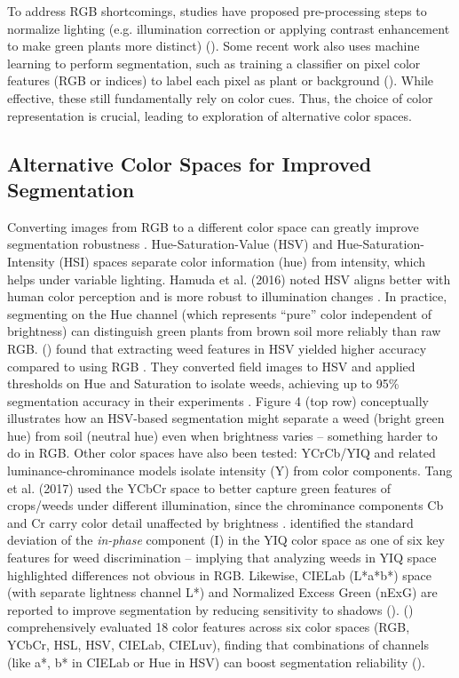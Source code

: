 \documentclass[letterpaper]{report}
\begin{document}
%
To address RGB shortcomings, studies have proposed pre-processing steps to normalize lighting (e.g. illumination correction or applying contrast enhancement to make green plants more distinct) (\cite{Lu2022-rq}). Some recent work also uses machine learning to perform segmentation, such as training a classifier on pixel color features (RGB or indices) to label each pixel as plant or background (\cite{Gee2020-cz}). While effective, these still fundamentally rely on color cues. Thus, the choice of color representation is crucial, leading to exploration of alternative color spaces.
%
\subsection{Alternative Color Spaces  for Improved Segmentation}  
Converting images from RGB to a different color space can greatly improve segmentation robustness \parencite{Khattab2014-eu}. Hue-Saturation-Value (HSV) and Hue-Saturation-Intensity (HSI) spaces separate color information (hue) from intensity, which helps under variable lighting. Hamuda et al. (2016) noted HSV aligns better with human color perception and is more robust to illumination changes \parencite{Hamuda2017-nf}. In practice, segmenting on the Hue channel (which represents “pure” color independent of brightness) can distinguish green plants from brown soil more reliably than raw RGB. \citeauthor{Priya2019-zw} (\citeyear{Priya2019-zw}) found that extracting weed features in HSV yielded higher accuracy compared to using RGB \parencite{Priya2019-zw}. They converted field images to HSV and applied thresholds on Hue and Saturation to isolate weeds, achieving up to 95\% segmentation accuracy in their experiments . Figure 4 (top row) conceptually illustrates how an HSV-based segmentation might separate a weed (bright green hue) from soil (neutral hue) even when brightness varies – something harder to do in RGB. 
%
Other color spaces have also been tested: YCrCb/YIQ and related luminance-chrominance models isolate intensity (Y) from color components. Tang et al. (2017) used the YCbCr space to better capture green features of crops/weeds under different illumination, since the chrominance components Cb and Cr carry color detail unaffected by brightness \parencite{Wu2021-gt}. \citeauthor{Sabzi2020-af} identified the standard deviation of the \textit{in-phase} component (I) in the YIQ color space as one of six key features for weed discrimination \parencite{Sabzi2020-af} – implying that analyzing weeds in YIQ space highlighted differences not obvious in RGB. Likewise, CIELab (L*a*b*) space (with separate lightness channel L*) and Normalized Excess Green (nExG) are reported to improve segmentation by reducing sensitivity to shadows (\parencite{Wu2021-gt}). \citeauthor{Guo2013-eq} (\citeyear{Guo2013-eq}) comprehensively evaluated 18 color features across six color spaces (RGB, YCbCr, HSL, HSV, CIELab, CIELuv), finding that combinations of channels (like a*, b* in CIELab or Hue in HSV) can boost segmentation reliability (\cite{Guo2013-eq}).  
\end{document}
